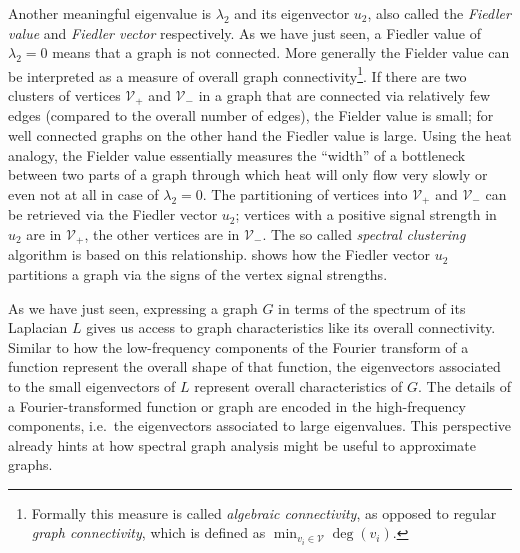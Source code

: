 Another meaningful eigenvalue is $\lambda_2$ and its eigenvector $u_2$, also called the \textit{Fiedler value} and \textit{Fiedler vector} respectively.
As we have just seen, a Fiedler value of $\lambda_2 = 0$ means that a graph is not connected.
More generally the Fielder value can be interpreted as a measure of overall graph connectivity\footnote{%
	Formally this measure is called \textit{algebraic connectivity}, as opposed to regular \textit{graph connectivity}, which is defined as $\min_{v_i \in \mathcal{V}} \deg(v_i)$.
}.
If there are two clusters of vertices $\mathcal{V}_+$ and $\mathcal{V}_-$ in a graph that are connected via relatively few edges (compared to the overall number of edges), the Fielder value is small;
for well connected graphs on the other hand the Fiedler value is large.
Using the heat analogy, the Fielder value essentially measures the ``width'' of a bottleneck between two parts of a graph through which heat will only flow very slowly or even not at all in case of $\lambda_2 = 0$.
The partitioning of vertices into $\mathcal{V}_+$ and $\mathcal{V}_-$ can be retrieved via the Fiedler vector $u_2$;
vertices with a positive signal strength in $u_2$ are in $\mathcal{V}_+$, the other vertices are in $\mathcal{V}_-$.
The so called \textit{spectral clustering} algorithm is based on this relationship.
 shows how the Fiedler vector $u_2$ partitions a graph via the signs of the vertex signal strengths.

As we have just seen, expressing a graph $G$ in terms of the spectrum of its Laplacian $L$ gives us access to graph characteristics like its overall connectivity.
Similar to how the low-frequency components of the Fourier transform of a function represent the overall shape of that function, the eigenvectors associated to the small eigenvectors of $L$ represent overall characteristics of $G$.
The details of a Fourier-transformed function or graph are encoded in the high-frequency components, i.e.\  the eigenvectors associated to large eigenvalues.
This perspective already hints at how spectral graph analysis might be useful to approximate graphs.
